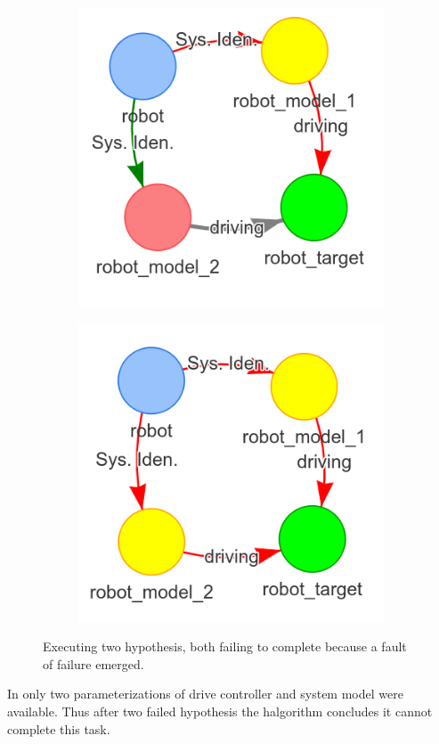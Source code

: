 \begin{figure}[H]
\begin{subfigure}{.3\textwidth}
    \end{subfigure}
    \begin{subfigure}{.3\textwidth}
    \centering
    \includegraphics[width=1\textwidth]{figures/proposed_method/connecting_nodes/failure/fail_6}
    \end{subfigure}

    \begin{subfigure}{.3\textwidth}
    \centering
    \includegraphics[width=1\textwidth]{figures/proposed_method/connecting_nodes/failure/fail_7}
    \end{subfigure}
    \hfill
    \caption{Executing two hypothesis, both failing to complete because a fault of failure emerged.}%
    \label{fig:failure_in_hgraph}
\end{figure}

In  only two parameterizations of drive controller and system model were available. Thus after two failed hypothesis the \ac{halgorithm} concludes it cannot complete this task.\bs
